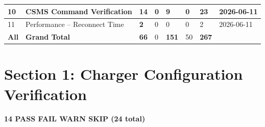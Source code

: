 \documentclass[10pt, a4paper]{article}
\begin{document}
\begin{longtable}{|C{0.8cm}|L{5.5cm}|C{1.2cm}|C{1.2cm}|C{1.2cm}|C{1.2cm}|C{1.0cm}|C{1.5cm}|}
\small 10 & \small CSMS Command Verification & \textcolor{passgreen}{\textbf{14}} & 0 & \textcolor{warnorange}{\textbf{9}} & 0 & \small 23 & \small 2026-06-11 \\ \hline
\small 11 & \small Performance -- Reconnect Time & \textcolor{passgreen}{\textbf{2}} & 0 & 0 & 0 & \small 2 & \small 2026-06-11 \\ \hline
{}\small \textbf{All} & \small \textbf{Grand Total} & \textcolor{passgreen}{\textbf{66}} & 0 & \textcolor{warnorange}{\textbf{151}} & \textcolor{skipgray}{50} & \small \textbf{267} & \\ \hline
\end{longtable}
\normalsize


\newpage
\section{Section 1: Charger Configuration Verification}
\textbf{14 PASS  FAIL  WARN  SKIP \quad (24 total)}
\end{document}
